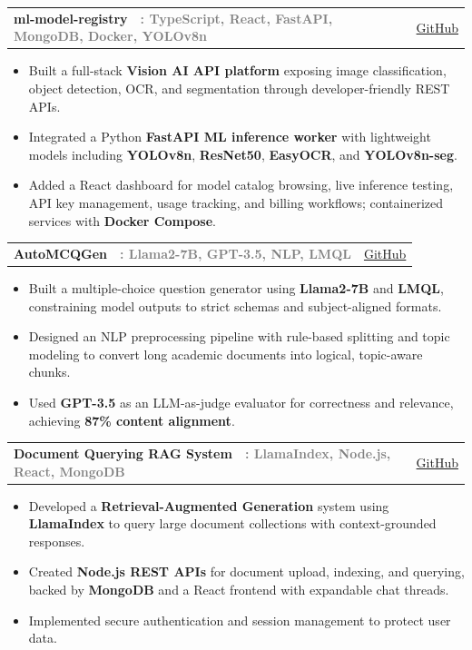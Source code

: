 \documentclass[a4paper,11pt]{article}
\makeatletter
\newcommand{\TitleText}[1]{\textbf{\large #1}}
\newcommand{\BlackBold}[1]{\textbf{#1}}
\newcommand{\GrayText}[1]{\textcolor{graytext}{\textbf{#1}}}
\newcommand{\ProjectLine}[4]{%
  \begin{tabularx}{\textwidth}{@{} X r @{}}
    {\TitleText{#1}\ \ \GrayText{: #2}} & {\small \href{#4}{\textcolor{linkblue}{#3}}} \\
  \end{tabularx}
}
\makeatother
\begin{document}
\ProjectLine{ml-model-registry}{TypeScript, React, FastAPI, MongoDB, Docker, YOLOv8n}{GitHub}{https://github.com/Makireddyvighnesh/ml-model-registry}
{\normalsize
\begin{itemize}
  \item Built a full-stack \BlackBold{Vision AI API platform} exposing image classification, object detection, OCR, and segmentation through developer-friendly REST APIs.
  \item Integrated a Python \BlackBold{FastAPI ML inference worker} with lightweight models including \BlackBold{YOLOv8n}, \BlackBold{ResNet50}, \BlackBold{EasyOCR}, and \BlackBold{YOLOv8n-seg}.
  \item Added a React dashboard for model catalog browsing, live inference testing, API key management, usage tracking, and billing workflows; containerized services with \BlackBold{Docker Compose}.
\end{itemize}
}

\vspace{3mm}

\ProjectLine{AutoMCQGen}{Llama2-7B, GPT-3.5, NLP, LMQL}{GitHub}{https://github.com/Makireddyvighnesh/AUtoMcqGen}
{\normalsize
\begin{itemize}
  \item Built a multiple-choice question generator using \BlackBold{Llama2-7B} and \BlackBold{LMQL}, constraining model outputs to strict schemas and subject-aligned formats.
  \item Designed an NLP preprocessing pipeline with rule-based splitting and topic modeling to convert long academic documents into logical, topic-aware chunks.
  \item Used \BlackBold{GPT-3.5} as an LLM-as-judge evaluator for correctness and relevance, achieving \BlackBold{87\% content alignment}.
\end{itemize}
}

\vspace{3mm}

\ProjectLine{Document Querying RAG System}{LlamaIndex, Node.js, React, MongoDB}{GitHub}{https://github.com/Makireddyvighnesh/RAG-LLM-Query-Engine}
{\normalsize
\begin{itemize}
  \item Developed a \BlackBold{Retrieval-Augmented Generation} system using \BlackBold{LlamaIndex} to query large document collections with context-grounded responses.
  \item Created \BlackBold{Node.js REST APIs} for document upload, indexing, and querying, backed by \BlackBold{MongoDB} and a React frontend with expandable chat threads.
  \item Implemented secure authentication and session management to protect user data.
\end{itemize}
}
\end{document}

